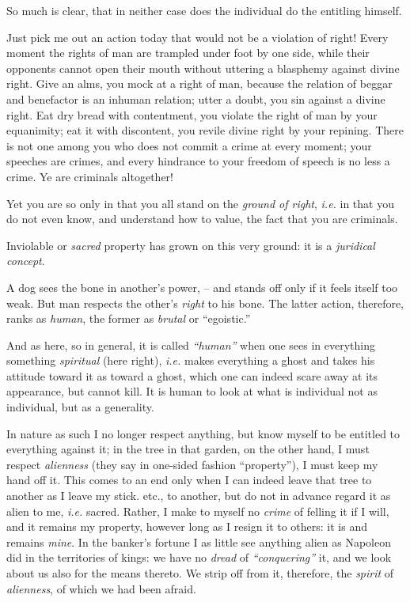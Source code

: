So much is clear, that in neither case does the individual do the entitling 
himself.

Just pick me out an action today that would not be a violation of right! Every 
moment the rights of man are trampled under foot by one side, while their 
opponents cannot open their mouth without uttering a blasphemy against divine 
right. Give an alms, you mock at a right of man, because the relation of 
beggar and benefactor is an inhuman relation; utter a doubt, you sin against a 
divine right. Eat dry bread with contentment, you violate the right of man by 
your equanimity; eat it with discontent, you revile divine right by your 
repining. There is not one among you who does not commit a crime at every 
moment; your speeches are crimes, and every hindrance to your freedom of 
speech is no less a crime. Ye are criminals altogether!

Yet you are so only in that you all stand on the \textit{ground of right}, 
\textit{i.e.} in that you do not even know, and understand how to value, the 
fact that you are criminals.

Inviolable or \textit{sacred} property has grown on this very ground: it is a 
\textit{juridical concept}.

A dog sees the bone in another's power, -- and stands off only if it feels 
itself too weak. But man respects the other's \textit{right} to his bone. The 
latter action, therefore, ranks as \textit{human}, the former as 
\textit{brutal} or ``egoistic.''

And as here, so in general, it is called \textit{``human''} when one sees in 
everything something \textit{spiritual} (here right), \textit{i.e.} makes 
everything a ghost and takes his attitude toward it as toward a ghost, which 
one can indeed scare away at its appearance, but cannot kill. It is human to 
look at what is individual not as individual, but as a generality.

In nature as such I no longer respect anything, but know myself to be entitled 
to everything against it; in the tree in that garden, on the other hand, I 
must respect \textit{alienness} (they say in one-sided fashion 
``property''), I must keep my hand off it. This comes to an end only when I 
can indeed leave that tree to another as I leave my stick. etc., to another, 
but do not in advance regard it as alien to me, \textit{i.e.} sacred. Rather, 
I make to myself no \textit{crime} of felling it if I will, and it remains my 
property, however long as I resign it to others: it is and remains 
\textit{mine}. In the banker's fortune I as little see anything alien as 
Napoleon did in the territories of kings: we have no \textit{dread} of 
\textit{``conquering''} it, and we look about us also for the means thereto. 
We strip off from it, therefore, the \textit{spirit} of \textit{alienness}, of 
which we had been afraid.

